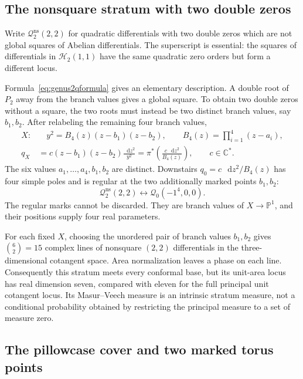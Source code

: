 \documentclass[11pt,a4paper]{article}
\numberwithin{equation}{section}
\theoremstyle{definition}
\theoremstyle{remark}
\newcommand{\dd}{\mathop{}\!\mathrm d}
\newcommand{\CC}{\mathbb C}
\begin{document}
\subsection{The nonsquare stratum with two double zeros}
\label{subsec:genus2twodouble}

Write $\mathcal Q^{\mathrm{ns}}_2(2,2)$ for quadratic
differentials with two double zeros which are not global squares
of Abelian differentials.  The superscript is essential: the
squares of differentials in $\mathcal H_2(1,1)$ have the same
quadratic zero orders but form a different locus.

Formula~\eqref{eq:genus2qformula} gives an elementary description.
A double root of $P_2$ away from the branch values gives a global
square.  To obtain two double zeros without a square, the two
roots must instead be two distinct branch values, say $b_1,b_2$.
After relabeling the remaining four branch values,
\begin{equation}
 \begin{split}
 X:&\quad y^2=B_4(z)(z-b_1)(z-b_2),
       \qquad B_4(z)=\prod_{i=1}^4(z-a_i),\\
 q_X&=c(z-b_1)(z-b_2)\frac{\dd z^2}{y^2}
      =\pi^*\left(\frac{c\,\dd z^2}{B_4(z)}\right),
      \qquad c\in\CC^*.
 \end{split}
 \label{eq:genus2cancel}
\end{equation}
The six values $a_1,\ldots,a_4,b_1,b_2$ are distinct.
Downstairs $q_0=c\,\dd z^2/B_4(z)$ has four simple poles and is
regular at the two additionally marked points $b_1,b_2$:
\begin{equation}
 \mathcal Q^{\mathrm{ns}}_2(2,2)
 \longleftrightarrow \mathcal Q_0(-1^4,0,0).
 \label{eq:genus2pillowmark}
\end{equation}
The regular marks cannot be discarded.  They are branch values of
$X\to\mathbb P^1$, and their positions supply four real
parameters.

For each fixed $X$, choosing the unordered pair of branch values
$b_1,b_2$ gives $\binom62=15$ complex lines of nonsquare
$(2,2)$ differentials in the three-dimensional cotangent space.
Area normalization leaves a phase on each line.  Consequently this
stratum meets every conformal base, but its unit-area locus has
real dimension seven, compared with eleven for the full principal
unit cotangent locus.  Its Masur--Veech measure is an intrinsic
stratum measure, not a conditional probability obtained by
restricting the principal measure to a set of measure zero.

\subsection{The pillowcase cover and two marked torus points}
\label{subsec:genus2ellipticcover}
\end{document}
